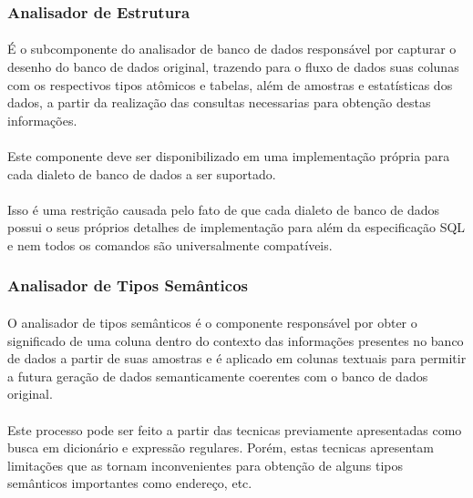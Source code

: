 \subsubsection{Analisador de Estrutura}

\paragraph{} É o subcomponente do analisador de banco de dados responsável por capturar o desenho do banco de dados original, trazendo para o fluxo de dados suas colunas com os respectivos tipos atômicos e tabelas, além de amostras e estatísticas dos dados, a partir da realização das consultas necessarias para obtenção destas informações.

\paragraph{} Este componente deve ser disponibilizado em uma implementação própria para cada dialeto de banco de dados a ser suportado.

\paragraph{} Isso é uma restrição causada pelo fato de que cada dialeto de banco de dados possui o seus próprios detalhes de implementação para além da especificação SQL e nem todos os comandos são universalmente compatíveis.

\subsubsection{Analisador de Tipos Semânticos}

\paragraph{} O analisador de tipos semânticos é o componente responsável por obter o significado de uma coluna dentro do contexto das informações presentes no banco de dados a partir de suas amostras e é aplicado em colunas textuais para permitir a futura geração de dados semanticamente coerentes com o banco de dados original.

\paragraph{} Este processo pode ser feito a partir das tecnicas previamente apresentadas como busca em dicionário e expressão regulares. Porém, estas tecnicas apresentam limitações que as tornam inconvenientes para obtenção de alguns tipos semânticos importantes como endereço, etc.


